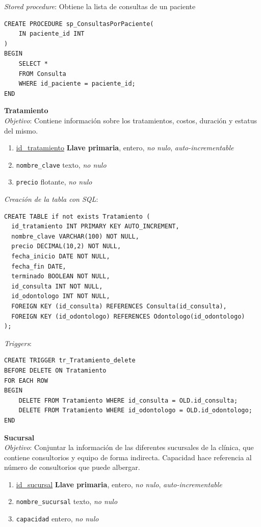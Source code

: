 \documentclass[a4paper,12pt]{article}
\begin{document}
\emph{Stored procedure}: Obtiene la lista de consultas de un paciente

\begin{verbatim}
CREATE PROCEDURE sp_ConsultasPorPaciente(
    IN paciente_id INT
)
BEGIN
    SELECT *
    FROM Consulta
    WHERE id_paciente = paciente_id;
END
\end{verbatim}

\textbf{Tratamiento} \\ \emph{Objetivo}: Contiene información sobre los tratamientos, costos, duración y estatus del mismo.
\begin{enumerate}
	\item \underline{id\_tratamiento} \textbf{Llave primaria}, entero, \emph{no nulo}, \textit{auto-incrementable}
	\item \texttt{nombre\_clave} texto, \emph{no nulo}
	\item \texttt{precio} flotante, \emph{no nulo}
\end{enumerate}

\emph{Creación de la tabla con SQL}: 
\begin{verbatim}
CREATE TABLE if not exists Tratamiento (
  id_tratamiento INT PRIMARY KEY AUTO_INCREMENT,
  nombre_clave VARCHAR(100) NOT NULL,
  precio DECIMAL(10,2) NOT NULL,
  fecha_inicio DATE NOT NULL,
  fecha_fin DATE,
  terminado BOOLEAN NOT NULL,
  id_consulta INT NOT NULL,
  id_odontologo INT NOT NULL,
  FOREIGN KEY (id_consulta) REFERENCES Consulta(id_consulta),
  FOREIGN KEY (id_odontologo) REFERENCES Odontologo(id_odontologo)
);
\end{verbatim}

\emph{Triggers}: 

\begin{verbatim}
CREATE TRIGGER tr_Tratamiento_delete
BEFORE DELETE ON Tratamiento
FOR EACH ROW
BEGIN
    DELETE FROM Tratamiento WHERE id_consulta = OLD.id_consulta;
    DELETE FROM Tratamiento WHERE id_odontologo = OLD.id_odontologo;
END
\end{verbatim}


\textbf{Sucursal} \\ \emph{Objetivo}: Conjuntar la información de las diferentes sucursales de la clínica, que contiene consultorios y equipo de forma indirecta. Capacidad hace referencia al número de consultorios que puede albergar.
\begin{enumerate}
	\item \underline{id\_sucursal} \textbf{Llave primaria}, entero, \emph{no nulo}, \textit{auto-incrementable}
	\item \texttt{nombre\_sucursal} texto, \emph{no nulo}
	\item \texttt{capacidad} entero, \emph{no nulo}
\end{enumerate}
\end{document}
